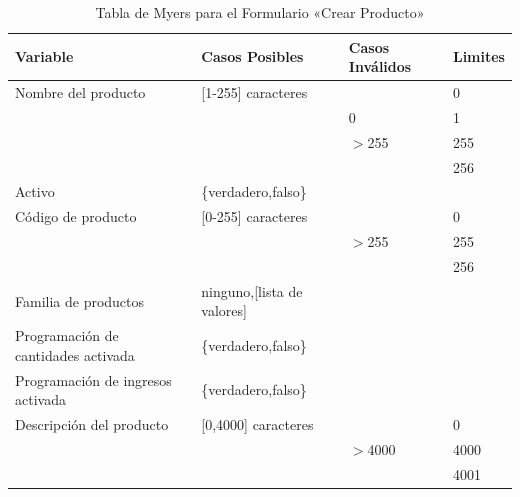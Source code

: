 \begin{table}[H]
\centering
\begin{tabular}{|p{6.0cm}|l|l|l|}
\hline
\footnotesize{\textbf{Variable}} & \footnotesize{\textbf{Casos Posibles}} & \footnotesize{\textbf{Casos Inválidos}} & \footnotesize{\textbf{Limites}} \\
\hline
\footnotesize{Nombre del producto} & \footnotesize{[1-255] caracteres} & & \footnotesize{0} \\
& & \footnotesize{0} & \footnotesize{1} \\
& & \footnotesize{$>$255} & \footnotesize{255} \\
& & & \footnotesize{256} \\
\hline
\footnotesize{Activo} & \footnotesize{\{verdadero,falso\}} & & \\
\hline
\footnotesize{Código de producto} & \footnotesize{[0-255] caracteres} & & \footnotesize{0} \\
& & \footnotesize{$>$255} & \footnotesize{255} \\
& & & \footnotesize{256} \\
\hline
\footnotesize{Familia de productos} & \footnotesize{ninguno,[lista de valores]} & & \\
\hline
\footnotesize{Programación de cantidades activada} & \footnotesize{\{verdadero,falso\}} & & \\
\hline
\footnotesize{Programación de ingresos activada} & \footnotesize{\{verdadero,falso\}} & & \\
\hline
\footnotesize{Descripción del producto} & \footnotesize{[0,4000] caracteres} & & \footnotesize{0} \\
& & \footnotesize{$>$4000} & \footnotesize{4000} \\
& & & \footnotesize{4001} \\
\hline
\end{tabular}
\caption{Tabla de Myers para el Formulario «Crear Producto»}
\label{myers_01}
\end{table}

